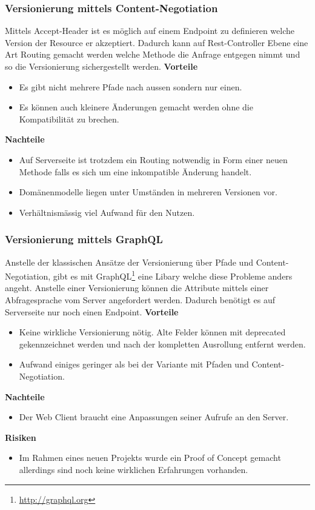 \subsubsection{Versionierung mittels Content-Negotiation}

Mittels Accept-Header ist es möglich auf einem Endpoint zu definieren welche Version der Resource er akzeptiert. Dadurch kann auf Rest-Controller Ebene eine Art Routing gemacht werden welche Methode die Anfrage entgegen nimmt und so die Versionierung sichergestellt werden.
\newline
\newline
\textbf{Vorteile}
\begin{itemize}
	\item Es gibt nicht mehrere Pfade nach aussen sondern nur einen.
	\item Es können auch kleinere Änderungen gemacht werden ohne die Kompatibilität zu brechen.
\end{itemize}
\textbf{Nachteile}
\begin{itemize}
	\item Auf Serverseite ist trotzdem ein Routing notwendig in Form einer neuen Methode falls es sich um eine inkompatible Änderung handelt.
	\item Domänenmodelle liegen unter Umständen in mehreren Versionen vor.
	\item Verhältnismässig viel Aufwand für den Nutzen.
\end{itemize}

\subsubsection{Versionierung mittels GraphQL}

Anstelle der klassischen Ansätze der Versionierung über Pfade und Content-Negotiation, gibt es mit GraphQL\footnote{\url{http://graphql.org}} eine Libary welche diese Probleme anders angeht. Anstelle einer Versionierung können die Attribute mittels einer Abfragesprache vom Server angefordert werden. Dadurch benötigt es auf Serverseite nur noch einen Endpoint.
\newline
\newline
\textbf{Vorteile}
\begin{itemize}
	\item Keine wirkliche Versionierung nötig. Alte Felder können mit deprecated gekennzeichnet werden und nach der kompletten Ausrollung entfernt werden.
	\item Aufwand einiges geringer als bei der Variante mit Pfaden und Content-Negotiation.
\end{itemize}
\textbf{Nachteile}
\begin{itemize}
	\item Der Web Client braucht eine Anpassungen seiner Aufrufe an den Server.
\end{itemize}
\textbf{Risiken}
\begin{itemize}
	\item Im Rahmen eines neuen Projekts wurde ein Proof of Concept gemacht allerdings sind noch keine wirklichen Erfahrungen vorhanden.
\end{itemize}

